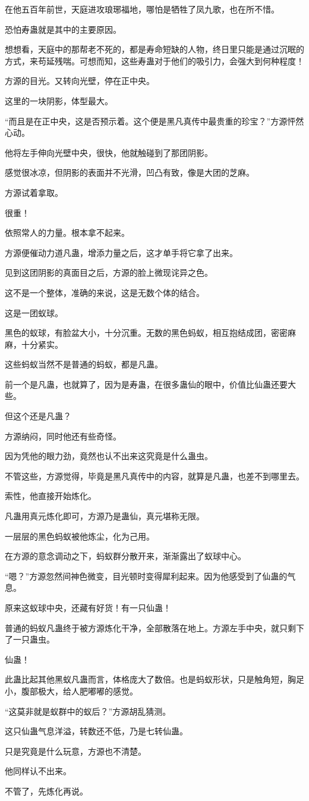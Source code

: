 \begin{this_body}
在他五百年前世，天庭进攻琅琊福地，哪怕是牺牲了凤九歌，也在所不惜。

恐怕寿蛊就是其中的主要原因。

想想看，天庭中的那帮老不死的，都是寿命短缺的人物，终日里只能是通过沉眠的方式，来苟延残喘。可想而知，这些寿蛊对于他们的吸引力，会强大到何种程度！

方源的目光。又转向光壁，停在正中央。

这里的一块阴影，体型最大。

“而且是在正中央，这是否预示着。这个便是黑凡真传中最贵重的珍宝？”方源怦然心动。

他将左手伸向光壁中央，很快，他就触碰到了那团阴影。

感觉很冰凉，但阴影的表面并不光滑，凹凸有致，像是大团的芝麻。

方源试着拿取。

很重！

依照常人的力量。根本拿不起来。

方源便催动力道凡蛊，增添力量之后，这才单手将它拿了出来。

见到这团阴影的真面目之后，方源的脸上微现诧异之色。

这不是一个整体，准确的来说，这是无数个体的结合。

这是一团蚁球。

黑色的蚁球，有脸盆大小，十分沉重。无数的黑色蚂蚁，相互抱结成团，密密麻麻，十分紧实。

这些蚂蚁当然不是普通的蚂蚁，都是凡蛊。

前一个是凡蛊，也就算了，因为是寿蛊，在很多蛊仙的眼中，价值比仙蛊还要大些。

但这个还是凡蛊？

方源纳闷，同时他还有些奇怪。

因为凭他的眼力劲，竟然也认不出来这究竟是什么蛊虫。

不管这些，方源觉得，毕竟是黑凡真传中的内容，就算是凡蛊，也差不到哪里去。

索性，他直接开始炼化。

凡蛊用真元炼化即可，方源乃是蛊仙，真元堪称无限。

一层层的黑色蚂蚁被他炼尘，化为己用。

在方源的意念调动之下，蚂蚁群分散开来，渐渐露出了蚁球中心。

“嗯？”方源忽然间神色微变，目光顿时变得犀利起来。因为他感受到了仙蛊的气息。

原来这蚁球中央，还藏有好货！有一只仙蛊！

普通的蚂蚁凡蛊终于被方源炼化干净，全部散落在地上。方源左手中央，就只剩下了一只蛊虫。

仙蛊！

此蛊比起其他黑蚁凡蛊而言，体格庞大了数倍。也是蚂蚁形状，只是触角短，胸足小，腹部极大，给人肥嘟嘟的感觉。

“这莫非就是蚁群中的蚁后？”方源胡乱猜测。

这只仙蛊气息洋溢，转数还不低，乃是七转仙蛊。

只是究竟是什么玩意，方源也不清楚。

他同样认不出来。

不管了，先炼化再说。

\end{this_body}

